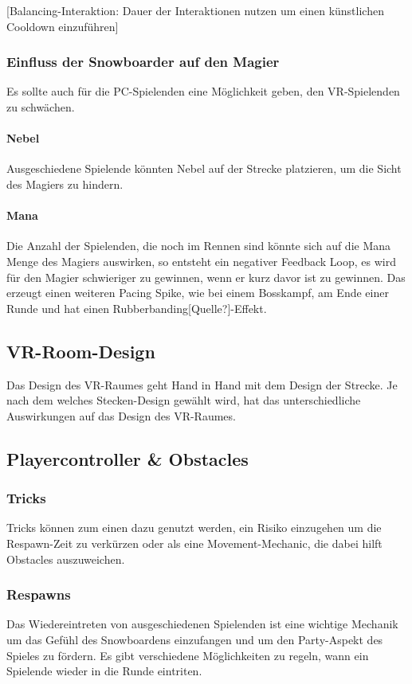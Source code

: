 [Balancing-Interaktion: Dauer der Interaktionen nutzen um einen künstlichen Cooldown einzuführen]

\subsubsection{Einfluss der Snowboarder auf den Magier}

Es sollte auch für die PC-Spielenden eine Möglichkeit geben, den VR-Spielenden zu schwächen.

\paragraph{Nebel}
Ausgeschiedene Spielende könnten Nebel auf der Strecke platzieren, um die Sicht des Magiers zu hindern.

\paragraph{Mana}
Die Anzahl der Spielenden, die noch im Rennen sind könnte sich auf die Mana Menge des Magiers auswirken, so entsteht ein negativer Feedback Loop, es wird für den Magier schwieriger zu gewinnen, wenn er kurz davor ist zu gewinnen. Das erzeugt einen weiteren Pacing Spike, wie bei einem Bosskampf, am Ende einer Runde und hat einen Rubberbanding[Quelle?]-Effekt.

\subsection{VR-Room-Design}

Das Design des VR-Raumes geht Hand in Hand mit dem Design der Strecke. Je nach dem welches Stecken-Design gewählt wird, hat das unterschiedliche Auswirkungen auf das Design des VR-Raumes.

\subsection{Playercontroller \& Obstacles\label{_playercontroller}}
\subsubsection{Tricks}
Tricks können zum einen dazu genutzt werden, ein Risiko einzugehen um die Respawn-Zeit zu verkürzen oder als eine Movement-Mechanic, die dabei hilft Obstacles auszuweichen.

\subsubsection{Respawns}
Das Wiedereintreten von ausgeschiedenen Spielenden ist eine wichtige Mechanik um das Gefühl des Snowboardens einzufangen und um den Party-Aspekt des Spieles zu fördern. Es gibt verschiedene Möglichkeiten zu regeln, wann ein Spielende wieder in die Runde eintriten.

